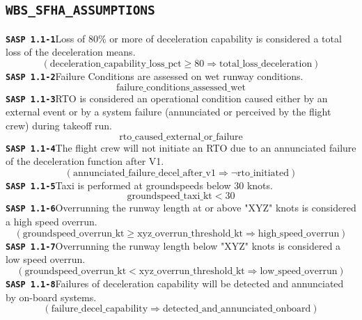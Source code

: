 \documentclass[11pt,a4paper]{article}
\begin{document}
\subsection*{\texttt{WBS\_SFHA\_ASSUMPTIONS}}
\noindent\textbf{\texttt{SASP 1.1-1}}\quad Loss of 80\% or more of deceleration capability is considered a total loss of the deceleration means.
\begin{dmath*}
(\text{deceleration\_capability\_loss\_pct} \geq 80 \Rightarrow \text{total\_loss\_deceleration})
\end{dmath*}
\noindent\textbf{\texttt{SASP 1.1-2}}\quad Failure Conditions are assessed on wet runway conditions.
\begin{dmath*}
\text{failure\_conditions\_assessed\_wet}
\end{dmath*}
\noindent\textbf{\texttt{SASP 1.1-3}}\quad RTO is considered an operational condition caused either by an external event or by a system failure (annunciated or perceived by the flight crew) during takeoff run.
\begin{dmath*}
\text{rto\_caused\_external\_or\_failure}
\end{dmath*}
\noindent\textbf{\texttt{SASP 1.1-4}}\quad The flight crew will not initiate an RTO due to an annunciated failure of the deceleration function after V1.
\begin{dmath*}
(\text{annunciated\_failure\_decel\_after\_v1} \Rightarrow \neg \text{rto\_initiated})
\end{dmath*}
\noindent\textbf{\texttt{SASP 1.1-5}}\quad Taxi is performed at groundspeeds below 30 knots.
\begin{dmath*}
\text{groundspeed\_taxi\_kt} < 30
\end{dmath*}
\noindent\textbf{\texttt{SASP 1.1-6}}\quad Overrunning the runway length at or above "XYZ" knots is considered a high speed overrun.
\begin{dmath*}
(\text{groundspeed\_overrun\_kt} \geq \text{xyz\_overrun\_threshold\_kt} \Rightarrow \text{high\_speed\_overrun})
\end{dmath*}
\noindent\textbf{\texttt{SASP 1.1-7}}\quad Overrunning the runway length below "XYZ" knots is considered a low speed overrun.
\begin{dmath*}
(\text{groundspeed\_overrun\_kt} < \text{xyz\_overrun\_threshold\_kt} \Rightarrow \text{low\_speed\_overrun})
\end{dmath*}
\noindent\textbf{\texttt{SASP 1.1-8}}\quad Failures of deceleration capability will be detected and annunciated by on-board systems.
\begin{dmath*}
(\text{failure\_decel\_capability} \Rightarrow \text{detected\_and\_annunciated\_onboard})
\end{dmath*}
\end{document}
